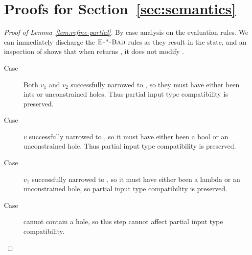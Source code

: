 \section{Proofs for Section~\ref{sec:semantics}}
\label{sec:proofs}

\begin{proof}[Proof of Lemma~\ref{lem:refine-partial}]
  By case analysis on the evaluation rules. We can immediately discharge
  the $\textsc{E-*-Bad}$ rules as they result in the \stuck state, and
  an inspection of \forcesym shows that when \forcesym returns \stuck,
  it does not modify \vsu.



  \begin{description}
  \item[Case \replusgood] Both $v_1$ and $v_2$ successfully narrowed to
    \tint, so they must have either been ints or unconstrained
    holes. Thus partial input type compatibility is preserved.

  \item[Case ] $v$ successfully narrowed to
    \tbool, so it must have either been a bool or an unconstrained hole.
    Thus partial input type compatibility is preserved.

  \item[Case \reappgood] $v_1$ successfully narrowed to \tfun, so it
    must have either been a lambda or an unconstrained hole, so partial
    input type compatibility is preserved.

  \item[Case \releafgood] \eleaf cannot contain a hole, so this step cannot
    affect partial input type compatibility.


\end{description}
\end{proof}
